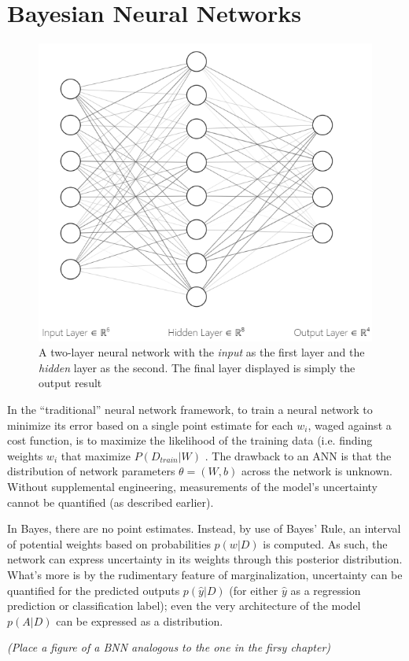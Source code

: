 \chapter{Bayesian Neural Networks}

\begin{figure}
  \vspace{-50pt}
    \centering
    \includegraphics[width=.4\textwidth]{Figures/NN_int.png}
    \caption{\footnotesize{A two-layer neural network with the \emph{input} as the first layer and the \emph{hidden} layer as the second.  The final layer displayed is simply the output result}}
  \label{NNet}
  \vspace{-20pt}
\end{figure}

 In the ``traditional'' neural network framework, to train a neural network to minimize its error based on a single point estimate for each $w_i$, waged against a cost function, is to maximize the likelihood of the training data (i.e. finding weights $w_i$ that maximize $P(D_{train}|W)$ \cite{bishop1995} \cite{bishop1997bayesian}.  The drawback to an ANN is that the distribution of network parameters $\theta = (W,b)$ across the network is unknown. \cite{mullachery2018bayesian}  Without supplemental engineering, measurements of the model's uncertainty cannot be quantified (as described earlier).
 
 In Bayes, there are no point estimates. Instead, by use of Bayes’ Rule, an interval of potential weights based on probabilities $p(w|D)$ is computed.  As such, the network can express uncertainty in its weights through this posterior distribution.  What's more is by the rudimentary feature of marginalization, uncertainty can be quantified for the predicted outputs $p(\hat{y}|D)$ (for either $\hat{y}$ as a regression prediction or classification label); even the very architecture of the model $p(A|D)$ can be expressed as a distribution. \cite{bishop1995}

 \textit{(Place a figure of a BNN analogous to the one in the firsy chapter)}
 

